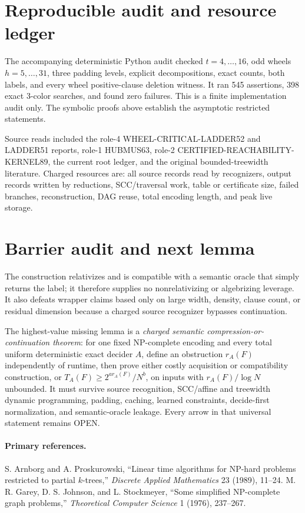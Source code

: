 \documentclass[11pt]{article}
\begin{document}
\section{Reproducible audit and resource ledger}
The accompanying deterministic Python audit checked $t=4,\ldots,16$, odd
wheels $h=5,\ldots,31$, three padding levels, explicit decompositions, exact
counts, both labels, and every wheel positive-clause deletion witness.  It ran
545 assertions, 398 exact 3-color searches, and found zero failures.  This is a
finite implementation audit only.  The symbolic proofs above establish the
asymptotic restricted statements.

Source reads included the role-4 WHEEL-CRITICAL-LADDER52 and LADDER51 reports,
role-1 HUBMUS63, role-2 CERTIFIED-REACHABILITY-KERNEL89, the current root
ledger, and the original bounded-treewidth literature.  Charged resources are:
all source records read by recognizers, output records written by reductions,
SCC/traversal work, table or certificate size, failed branches, reconstruction,
DAG reuse, total encoding length, and peak live storage.

\section{Barrier audit and next lemma}
The construction relativizes and is compatible with a semantic oracle that
simply returns the label; it therefore supplies no nonrelativizing or
algebrizing leverage.  It also defeats wrapper claims based only on large
width, density, clause count, or residual dimension because a charged source
recognizer bypasses continuation.

The highest-value missing lemma is a \emph{charged semantic
compression-or-continuation theorem}: for one fixed NP-complete encoding and
every total uniform deterministic exact decider $A$, define an obstruction
$r_A(F)$ independently of runtime, then prove either costly acquisition or
compatibility construction, or
$T_A(F)\ge2^{a r_A(F)}/N^b$, on inputs with
$r_A(F)/\log N$ unbounded.  It must survive source recognition, SCC/affine and
treewidth dynamic programming, padding, caching, learned constraints,
decide-first normalization, and semantic-oracle leakage.  Every arrow in that
universal statement remains OPEN.

\paragraph{Primary references.}
S. Arnborg and A. Proskurowski, ``Linear time algorithms for NP-hard problems
restricted to partial $k$-trees,'' \emph{Discrete Applied Mathematics} 23
(1989), 11--24.  M. R. Garey, D. S. Johnson, and L. Stockmeyer,
``Some simplified NP-complete graph problems,'' \emph{Theoretical Computer
Science} 1 (1976), 237--267.
\end{document}
